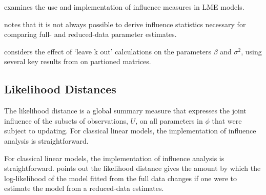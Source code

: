 \documentclass[12pt, a4paper]{report}
\theoremstyle{plain}
\theoremstyle{definition}
\theoremstyle{remark}
\begin{document}
	
	\citet{schabenberger} examines the use and implementation of
	influence measures in LME models.
	
	
	
	
	
	
	
	
	
	
	
	
	
	
	
	
	
	
	
	\citet{schabenberger} notes that it is not always possible to
	derive influence statistics necessary for comparing full- and
	reduced-data parameter estimates. 
	
	

	
	
	
	\citet{Haslett99} considers the effect of `leave k out'
	calculations on the parameters $\beta$ and $\sigma^{2}$, using
	several key results from \citet{HaslettHayes} on partioned
	matrices.
	
	
	
	
	
	
	
	

	\subsection{Likelihood Distances}
	
	The  likelihood distance is a global summary measure that expresses the joint influence of the subsets of observations, $U$, on all parameters in $\phi$ that were subject to updating. For classical linear models, the implementation of influence analysis is straightforward. 
	
	
	For classical linear models, the implementation of influence analysis is straightforward. \citet{schabenberger} points out the likelihood distance gives the amount by which the log-likelihood of the model fitted from the full data changes if one were
	to estimate the model from a reduced-data estimates. 
	
\end{document}
